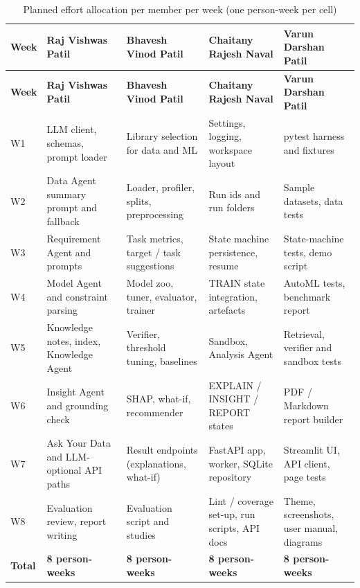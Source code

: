 \begingroup
\linespread{1}\small
\setlength{\tabcolsep}{4pt}
\begin{longtable}{|>{\raggedright\arraybackslash\hspace{0pt}}p{}|>{\raggedright\arraybackslash\hspace{0pt}}p{}|>{\raggedright\arraybackslash\hspace{0pt}}p{}|>{\raggedright\arraybackslash\hspace{0pt}}p{}|>{\raggedright\arraybackslash\hspace{0pt}}p{}|}
\caption{Planned effort allocation per member per week (one person-week per cell)}\label{tab:3.5}\\
\hline
\rowcolor{tableheader}\textbf{Week} & \textbf{Raj Vishwas Patil} & \textbf{Bhavesh Vinod Patil} & \textbf{Chaitany Rajesh Naval} & \textbf{Varun Darshan Patil} \\
\hline
\endfirsthead
\hline
\rowcolor{tableheader}\textbf{Week} & \textbf{Raj Vishwas Patil} & \textbf{Bhavesh Vinod Patil} & \textbf{Chaitany Rajesh Naval} & \textbf{Varun Darshan Patil} \\
\endhead
W1 & LLM client, schemas, prompt loader & Library selection for data and ML & Settings, logging, workspace layout & pytest harness and fixtures \\ \hline
W2 & Data Agent summary prompt and fallback & Loader, profiler, splits, preprocessing & Run ids and run folders & Sample datasets, data tests \\ \hline
W3 & Requirement Agent and prompts & Task metrics, target / task suggestions & State machine persistence, resume & State-machine tests, demo script \\ \hline
W4 & Model Agent and constraint parsing & Model zoo, tuner, evaluator, trainer & TRAIN state integration, artefacts & AutoML tests, benchmark report \\ \hline
W5 & Knowledge notes, index, Knowledge Agent & Verifier, threshold tuning, baselines & Sandbox, Analysis Agent & Retrieval, verifier and sandbox tests \\ \hline
W6 & Insight Agent and grounding check & SHAP, what-if, recommender & EXPLAIN / INSIGHT / REPORT states & PDF / Markdown report builder \\ \hline
W7 & Ask Your Data and LLM-optional API paths & Result endpoints (explanations, what-if) & FastAPI app, worker, SQLite repository & Streamlit UI, API client, page tests \\ \hline
W8 & Evaluation review, report writing & Evaluation script and studies & Lint / coverage set-up, run scripts, API docs & Theme, screenshots, user manual, diagrams \\ \hline
\textbf{Total} & \textbf{8 person-weeks} & \textbf{8 person-weeks} & \textbf{8 person-weeks} & \textbf{8 person-weeks} \\ \hline
\end{longtable}
\endgroup

